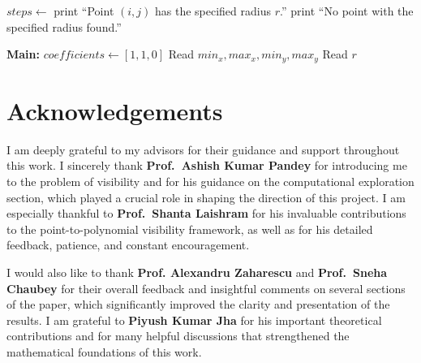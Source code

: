 \documentclass[12pt, reqno]{amsart}
\theoremstyle{definition}
\theoremstyle{remark}
\numberwithin{equation}{section}
\begin{document}
\begin{algorithm}[H]
\ContinuedFloat
\caption{Search for Lattice Point with Specified Visibility Radius (continued)}
\begin{algorithmic}[1]

            \State $steps \gets$ 
                \State print ``Point $(i, j)$ has the specified radius $r$.''
                \State \Return
            \EndIf
        \EndFor
    \EndFor
    \State print ``No point with the specified radius found.''
\EndFunction


\Statex
\State \textbf{Main:}
\State $coefficients \gets [1, 1, 0]$
\State Read $min_x, max_x, min_y, max_y$
\State Read $r$
\State {}

\end{algorithmic}
\end{algorithm}
\newpage



\hspace{0.2em}

\vspace{-1.0cm}
\section*{Acknowledgements}

I am deeply grateful to my advisors for their guidance and support throughout this work. I sincerely thank \textbf{Prof.\ Ashish Kumar Pandey} for introducing me to the problem of visibility and for his guidance on the computational exploration section, which played a crucial role in shaping the direction of this project. I am especially thankful to \textbf{Prof.\ Shanta Laishram} for his invaluable contributions to the point-to-polynomial visibility framework, as well as for his detailed feedback, patience, and constant encouragement.


I would also like to thank \textbf{Prof. Alexandru Zaharescu} and  \textbf{Prof.\ Sneha Chaubey} for their overall feedback and insightful comments on several sections of the paper, which significantly improved the clarity and presentation of the results. I am grateful to \textbf{Piyush Kumar Jha} for his important theoretical contributions and for many helpful discussions that strengthened the mathematical foundations of this work.
\end{document}
